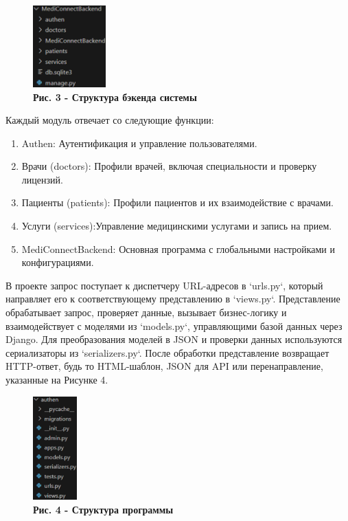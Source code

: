 \begin{multicols}{2}


\begin{figure}[H]
	\centering
	\includegraphics[width=0.25\textwidth]{assets/153}
	\caption*{\bfseries Рис. 3 - Структура бэкенда системы}
\end{figure}



Каждый модуль отвечает со следующие функции:
\begin{enumerate}
\def\labelenumi{\arabic{enumi}.}
\item
  Authen: Аутентификация и управление пользователями.
\item
  Врачи (doctors): Профили врачей, включая специальности и проверку
  лицензий.
\item
  Пациенты (patients): Профили пациентов и их взаимодействие с врачами.
\item
  Услуги (services):Управление медицинскими услугами и запись на прием.
\item
  MediConnectBackend: Основная программа с глобальными настройками и
  конфигурациями.
\end{enumerate}


В проекте запрос поступает к диспетчеру URL-адресов в `urls.py`, который
направляет его к соответствующему представлению в `views.py`.
Представление обрабатывает запрос, проверяет данные, вызывает
бизнес-логику и взаимодействует с моделями из `models.py`, управляющими
базой данных через Django. Для преобразования моделей в JSON и проверки
данных используются сериализаторы из `serializers.py`. После обработки
представление возвращает HTTP-ответ, будь то HTML-шаблон, JSON для API
или перенаправление, указанные на Рисунке 4.


\begin{figure}[H]
	\centering
	\includegraphics[width=0.15\textwidth]{assets/154}
	\caption*{\bfseries Рис. 4 - Структура программы}
\end{figure}


\end{multicols}
